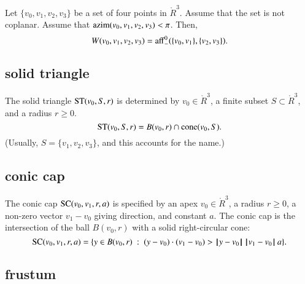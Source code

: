 \begin{lemma} Let $\{v_0,v_1,v_2,v_3\}$ be a set of four points
in $\ring{R}^3$.  Assume that the set is not coplanar.
Assume that ${\operatorname{azim}}(v_0,v_1,v_2,v_3)<\pi$.
Then,
   $$W(v_0,v_1,v_2,v_3) = {\operatorname{aff}}^0_-(\{v_0,v_1\},\{v_2,v_3\}).$$
\end{lemma}


\subsection{solid triangle}

\begin{definition} The solid triangle ${\operatorname{ST}}(v_0,S,r)$ is
determined by  $v_0\in\ring{R}^3$, a finite subset $S\subset\ring{R}^3$,
and a radius $r\ge0$. 
    $$
    {\operatorname{ST}}(v_0,S,r) = 
    B(v_0,r)\cap {\operatorname{cone}}(v_0,S).
    $$
(Usually, $S=\{v_1,v_2,v_3\}$, and this accounts for
the name.)
\end{definition}



\subsection{conic cap}


\begin{definition}
The conic cap ${\operatorname{SC}}(v_0,v_1,r,a)$ is specified by an apex
$v_0\in\ring{R}^3$, a radius $r\ge0$, a non-zero vector $v_1-v_0$ giving
direction, and constant $a$.  The conic cap is the intersection of
the ball $B(v_0,r)$ with a solid right-circular cone:
    $$
    {\operatorname{SC}}(v_0,v_1,r,a)=\{y \in B(v_0,r) \ :\  (y-v_0)\cdot (v_1-v_0) > {\hskip0.1em|\hskip-0.15em|\hskip0.1em}y - v_0{\hskip0.1em|\hskip-0.15em|\hskip0.1em}\, {\hskip0.1em|\hskip-0.15em|\hskip0.1em}v_1 - v_0{\hskip0.1em|\hskip-0.15em|\hskip0.1em}\, a\}.
    $$
\end{definition}

\subsection{frustum}

